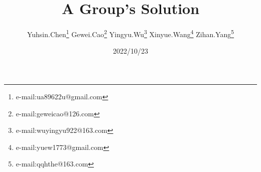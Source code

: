 \documentclass{article}
\begin{document}
\title{A Group's Solution}
\author{Yuhsin.Chen\thanks{e-mail:ua89622u@gmail.com}
Gewei.Cao\thanks{e-mail:geweicao@126.com}
Yingyu.Wu\thanks{e-mail:wuyingyu922@163.com}
Xinyue.Wang\thanks{e-mail:yuew1773@gmail.com}
Zihan.Yang\thanks{e-mail:qqhthe@163.com}}
\date{2022/10/23}
\maketitle










\end{document}
